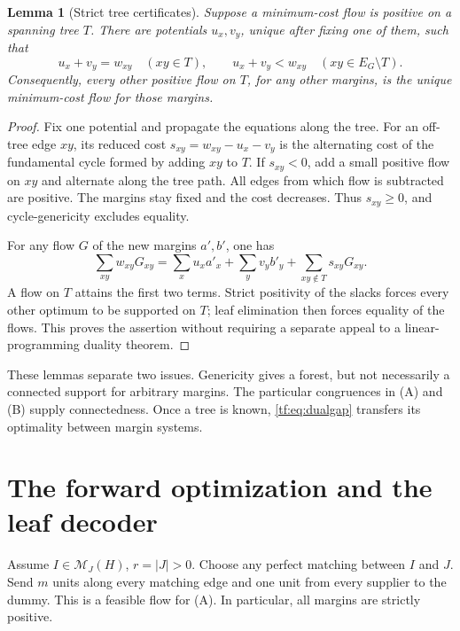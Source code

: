 \documentclass[11pt]{article}
\numberwithin{equation}{section}
\newtheorem{lemma}[theorem]{Lemma}
\theoremstyle{definition}
\newcommand{\PM}{\mathcal M}
\begin{document}
\begin{lemma}[Strict tree certificates]
\label{tf:lem:dual}
Suppose a minimum-cost flow is positive on a spanning tree $T$. There
are potentials $u_x,v_y$, unique after fixing one of them, such that
\begin{equation}
 u_x+v_y=w_{xy}\quad(xy\in T),\qquad
 u_x+v_y<w_{xy}\quad(xy\in E_G\setminus T).
 \label{tf:eq:dual}
\end{equation}
Consequently, every other positive flow on $T$, for any other margins,
is the unique minimum-cost flow for those margins.
\end{lemma}
\begin{proof}
Fix one potential and propagate the equations along the tree. For an
off-tree edge $xy$, its reduced cost
$s_{xy}=w_{xy}-u_x-v_y$ is the alternating cost of the fundamental cycle
formed by adding $xy$ to $T$. If $s_{xy}<0$, add a small positive flow on
$xy$ and alternate along the tree path. All edges from which flow is
subtracted are positive. The margins stay fixed and the cost decreases.
Thus $s_{xy}\ge0$, and cycle-genericity excludes equality.

For any flow $G$ of the new margins $a',b'$, one has
\begin{equation}
 \sum_{xy}w_{xy}G_{xy}
 =\sum_xu_xa'_x+\sum_yv_yb'_y+
   \sum_{xy\notin T}s_{xy}G_{xy}.
 \label{tf:eq:dualgap}
\end{equation}
A flow on $T$ attains the first two terms. Strict positivity of the slacks
forces every other optimum to be supported on $T$; leaf elimination then
forces equality of the flows. This proves the assertion without requiring
a separate appeal to a linear-programming duality theorem.
\end{proof}

These lemmas separate two issues. Genericity gives a forest, but not
necessarily a connected support for arbitrary margins. The particular
congruences in (A) and (B) supply connectedness. Once a tree is known,
\eqref{tf:eq:dualgap} transfers its optimality between margin systems.

\section{The forward optimization and the leaf decoder}
\label{tf:sec:forward}
Assume $I\in\PM_J(H)$, $r=|J|>0$. Choose any perfect matching between
$I$ and $J$. Send $m$ units along every matching edge and one unit from
every supplier to the dummy. This is a feasible flow for (A). In
particular, all margins are strictly positive.
\end{document}

